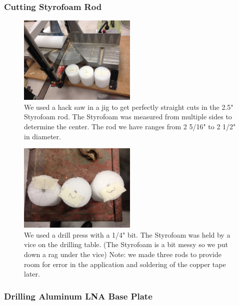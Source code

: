 \documentclass[11pt]{article} %
\begin{document}
\subsubsection{Cutting Styrofoam Rod}


\begin{figure}
  \centering
  \caption{We used a hack saw in a jig to get perfectly straight cuts in the 2.5" Styrofoam rod. The Styrofoam was measured from multiple sides to determine the center. The rod we have ranges from 2 5/16" to 2 1/2" in diameter.}
  \includegraphics[width=0.50\textwidth]{feed/01.jpeg}
\end{figure}


\begin{figure}
  \centering
  \caption{We used a drill press with a 1/4" bit. The Styrofoam was held by a vice on the drilling table. (The Styrofoam is a bit messy so we put down a rag under the vice) Note: we made three rods to provide room for error in the application and soldering of the copper tape later. }
  \includegraphics[width=0.50\textwidth]{feed/02.jpeg}
\end{figure}



\subsubsection{Drilling Aluminum LNA Base Plate}
\end{document}

